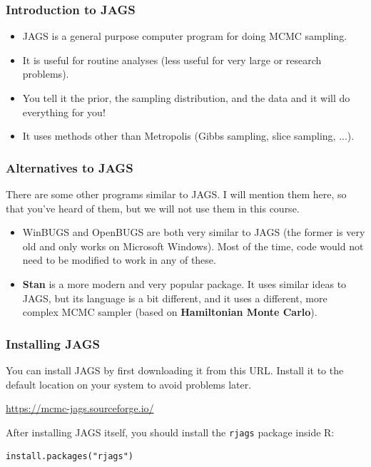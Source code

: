 \documentclass{beamer}
\begin{document}
\begin{frame}
\frametitle{Introduction to JAGS}

\begin{itemize}
\item JAGS is a general purpose computer program for doing
MCMC sampling.\pause
\item It is useful for routine analyses (less useful for very large or
research problems).\pause
\item You tell it the prior, the sampling distribution, and the data and it will
do everything for you!\pause
\item It uses methods other than Metropolis (Gibbs sampling,
slice sampling, ...).
\end{itemize}

\end{frame}


\begin{frame}
\frametitle{Alternatives to JAGS}

There are some other programs similar to JAGS. I will mention them here,
so that you've heard of them, but we will not use them in this course.

\begin{itemize}
\item WinBUGS and OpenBUGS are both very similar to JAGS (the former is very
old and only works on Microsoft Windows).
Most of the time, code would not need to be modified to work in any of these.\pause
\item {\bf Stan} is a more modern and very popular package. It uses similar
ideas to JAGS, but its language is a bit different, and it uses a different,
more complex
MCMC sampler (based on {\bf Hamiltonian Monte Carlo}).
\end{itemize}

\end{frame}

\begin{frame}[fragile]
\frametitle{Installing JAGS}
You can install JAGS by first downloading it from this URL. Install it to
the default location on your system to avoid problems later.

\begin{center}
\url{https://mcmc-jags.sourceforge.io/}
\end{center}

\pause

After installing JAGS itself, you should install the \texttt{rjags}
package inside R:
\begin{verbatim}
install.packages("rjags")
\end{verbatim}

\end{frame}
\end{document}
